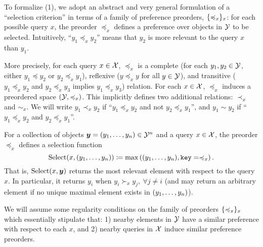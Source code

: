 To formalize (1), we adopt an abstract and very general formulation of a ``selection criterion'' in terms of a family of preference preorders, $\{\preccurlyeq_x\}_x$: for each possible query $x$, the preorder $\preceq_x$ defines a preference over objects in ${\mathcal{Y}}$ to be selected. Intuitively, ``$y_1 \preceq_x y_2$'' means that $y_2$ is more relevant to the query $x$ than $y_1$.

More precisely, for each query $x \in {\mathcal{X}}$, $\preceq_x$ is a complete (for each $y_1, y_2 \in {\mathcal{Y}}$, either $y_1 \preceq y_2$ or $y_2 \preceq_x y_1$), reflexive ($y \preceq_x y$ for all $y \in {\mathcal{Y}}$), and transitive ($y_1 \preceq_x y_2$ and $y_2 \preceq_x y_3$ implies $y_1 \preceq_x y_3$) relation. For each $x \in {\mathcal{X}}$, $\preceq_x$ induces a preordered space $({\mathcal{Y}}, \preccurlyeq_x)$. This implicitly defines two additional relations: $\prec_x$ and $\sim_x$. We will write $y_1 \prec_x y_2$ if ``$y_1 \preceq_x y_2$ and not $y_2 \preceq_x y_1$'', and $y_1 \sim y_2$ if ``$y_1 \preceq_x y_2$ and $y_2 \preceq_x y_1$''.

For a collection of objects $\bm{y} = (y_1, \ldots, y_n) \in {\mathcal{Y}}^n$ and a query $x \in {\mathcal{X}}$, the preorder $\preceq_x$ defines a selection function
\begin{equation}\label{eq:def_selection}
  \mathrm{Select}(x, (y_1, \ldots, y_n)) \coloneq \max\left((y_1, \ldots, y_n), \mathtt{key}=\preccurlyeq_x\right).
\end{equation}
That is, $\mathrm{Select}(x, \bm{y})$ returns the most relevant element with respect to the query $x$. In particular, it returns $y_i$ when $y_i \succ_x y_j, \ \forall j \neq i$ (and may return an arbitrary element if no unique maximal element exists in $(y_1, \ldots, y_n)$).

We will assume some regularity conditions on the family of preorders $\{\preccurlyeq_x\}_x$ which essentially stipulate that: 1) nearby elements in ${\mathcal{Y}}$ have a similar preference with respect to each $x$, and 2) nearby queries in ${\mathcal{X}}$ induce similar preference preorders.

